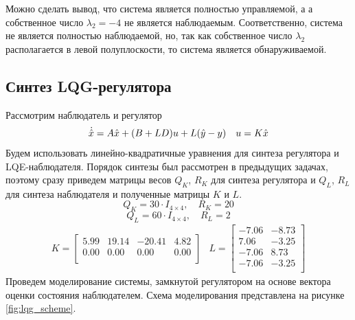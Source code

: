 Можно сделать вывод, что система является полностью управляемой, а 
а собственное число $\lambda_2 = -4$ не является наблюдаемым. Соответственно, 
система не является полностью наблюдаемой, но, так как собственное число 
$\lambda_2$ располагается в левой полуплоскости, то система является обнаруживаемой. 

\subsection{Синтез LQG-регулятора}
Рассмотрим наблюдатель и регулятор 
\begin{equation}
    \dot{\hat{x}} = A\hat{x} + (B + LD)u + L(\hat{y} - y) \\ \quad u = K\hat{x}
\end{equation}
Будем использовать линейно-квадратичные уравнения для синтеза регулятора и LQE-наблюдателя. 
Порядок синтезы был рассмотрен в предыдущих задачах, поэтому сразу приведем матрицы 
весов $Q_K$, $R_K$ для синтеза регулятора и $Q_L$, $R_L$ для синтеза наблюдателя и 
полученные матрицы $K$ и $L$.
\begin{equation}
    Q_K = 30 \cdot I_{4\times4}, \quad R_K = 20
\end{equation}
\begin{equation}
    Q_L = 60 \cdot I_{4\times4}, \quad R_L = 2
\end{equation}
\begin{equation}
    \begin{array}{cc}
        K = \begin{bmatrix}
        5.99  & 19.14  & -20.41  & 4.82 \\ 
        0.00  & 0.00  & 0.00  & 0.00 \\
        \end{bmatrix} &
        L = \begin{bmatrix}
        -7.06  & -8.73 \\ 
        7.06  & -3.25 \\ 
        -7.06  & 8.73 \\ 
        -7.06  & -3.25 \\
        \end{bmatrix}
    \end{array}
\end{equation}
Проведем моделирование системы, замкнутой регулятором на основе вектора оценки 
состояния наблюдателем. Схема моделирования представлена на рисунке \ref{fig:lqg_scheme}.
